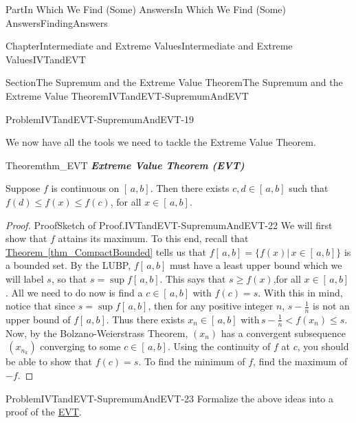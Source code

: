 \documentclass[oneside,10pt,]{book}
\newcommand{\xreffont}{\relax}
\newcommand{\alert}[1]{\textbf{\textit{#1}}}
\newcommand{\terminology}[1]{\textbf{#1}}
\numberwithin{equation}{part}
\newcommand{\lt}{<}
\begin{document}
\begin{partptx}{Part}{In Which We Find (Some) Answers}{}{In Which We Find (Some) Answers}{}{}{FindingAnswers}
\begin{chapterptx}{Chapter}{Intermediate and Extreme Values}{}{Intermediate and Extreme Values}{}{}{IVTandEVT}
\begin{sectionptx}{Section}{The Supremum and the Extreme Value Theorem}{}{The Supremum and the Extreme Value Theorem}{}{}{IVTandEVT-SupremumAndEVT}
\begin{problem}{Problem}{}{IVTandEVT-SupremumAndEVT-19}
\begin{enumerate}[label={(\alph*)}]
\end{enumerate}
%
\end{problem}
We now have all the tools we need to tackle the Extreme Value Theorem.%
\begin{theorem}{Theorem}{}{}{thm_EVT}%
\alert{Extreme Value Theorem (\terminology{EVT})}%
\par
{} Suppose \(f\) is continuous on \([\,a,b]\). Then there exists \(c,d\in[\,a,b]\) such that \(f(d)\leq f(x)\leq f(c)\), for all \(x\in[\,a,b]\).%
\end{theorem}
\begin{proof}{Proof}{Sketch of Proof.}{IVTandEVT-SupremumAndEVT-22}
We will first show that \(f\) attains its maximum. To this end, recall that \hyperref[thm_CompactBounded]{Theorem~{\xreffont\ref{thm_CompactBounded}}} tells us that \(f[\,a,b]=\{f(x)|\,x\in[\,a,b]\}\) is a bounded set. By the LUBP, \(f[\,a,b]\) must have a least upper bound which we will label \(s\), so that \(s=\sup f[\,a,b]\). This says that \(s\geq f(x)\),for all \(x\in[\,a,b]\). All we need to do now is find a \(c\in[\,a,b]\) with \(f(c)=s\). With this in mind, notice that since \(s=\sup f[\,a,b]\), then for any positive integer \(n\), \(s-\frac{1}{n}\) is not an upper bound of \(f[\,a,b]\). Thus there exists \(x_n\in[\,a,b]\) with\(\,s-\frac{1}{n}\lt f(x_n)\leq s\). Now, by the Bolzano-Weierstrass Theorem, \(\left(x_n\right)\) has a convergent subsequence\(\,\left(x_{n_k}\right)\) converging to some \(c\in[\,a,b]\). Using the continuity of \(f\) at \(c\), you should be able to show that \(f(c)=s\). To find the minimum of \(f\), find the maximum of \(-f\).%
\end{proof}
\begin{problem}{Problem}{}{IVTandEVT-SupremumAndEVT-23}%
 Formalize the above ideas into a proof of the \hyperref[thm_EVT]{EVT}.%
\end{problem}

\end{sectionptx}
\end{chapterptx}
\end{partptx}
\end{document}
